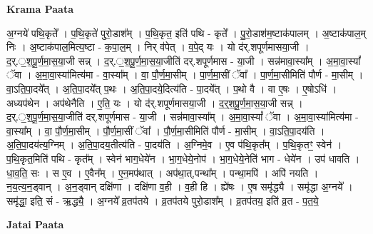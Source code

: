 \documentclass[17pt]{extarticle}
\begin{document}
\textbf{Krama Paata} \newline

अ॒ग्नये॑ पथि॒कृते᳚ । प॒थि॒कृते॑ पुरो॒डाश᳚म् । प॒थि॒कृत॒ इति॑ पथि - कृते᳚ । पु॒रो॒डाश॑म॒ष्टाक॑पालम् । अ॒ष्टाक॑पाल॒म् निः । अ॒ष्टाक॑पाल॒मित्य॒ष्टा - क॒पा॒ल॒म् । निर् व॑पेत् । व॒पे॒द् यः । यो द॑र्.शपूर्णमासया॒जी । द॒र्.॒श॒पू॒र्ण॒मा॒स॒या॒जी सन्न् । द॒र्.॒श॒पू॒र्ण॒मा॒स॒या॒जीति॑ दर्.शपूर्णमास - या॒जी । सन्न॑मावा॒स्या᳚म् । अ॒मा॒वा॒स्यां᳚ ॅवा । अ॒मा॒वा॒स्या॑मित्य॑मा - वा॒स्या᳚म् । वा॒ पौ॒र्ण॒मा॒सीम् । पा॒र्ण॒मा॒सीं ॅवा᳚ । पा॒र्ण॒मा॒सीमिति॑ पौर्ण - मा॒सीम् । वा॒ऽति॒पा॒दये᳚त् । अ॒ति॒पा॒दये᳚त् प॒थः । अ॒ति॒पा॒दये॒दित्य॑ति - पा॒दये᳚त् । प॒थो वै । वा ए॒षः । ए॒षोऽधि॑ । अध्यप॑थेन । अप॑थेनैति । ए॒ति॒ यः । यो द॑र्.शपूर्णमासया॒जी । द॒र्॒श॒पू॒र्ण॒मा॒स॒या॒जी सन्न् । 
द॒र्.॒श॒पू॒र्ण॒मा॒स॒या॒जीति॑ दर्.शपूर्णमास - या॒जी । सन्न॑मावा॒स्या᳚म् । अ॒मा॒वा॒स्यां᳚ ॅवा । अ॒मा॒वा॒स्या॑मित्य॑मा - वा॒स्या᳚म् । वा॒ पौ॒र्ण॒मा॒सीम् । पौ॒र्ण॒मा॒सीं ॅवा᳚ । पौ॒र्ण॒मा॒सीमिति॑ पौर्ण - मा॒सीम् । वा॒ऽति॒पा॒दय॑ति । अ॒ति॒पा॒दय॑त्य॒ग्निम् । अ॒ति॒पा॒दय॒तीत्य॑ति - पा॒दय॑ति । अ॒ग्निमे॒व । ए॒व प॑थि॒कृत᳚म् । प॒थि॒कृतꣳ॒॒ स्वेन॑ । प॒थि॒कृत॒मिति॑ पथि - कृत᳚म् । स्वेन॑ भाग॒धेये॑न । भा॒ग॒धेये॒नोप॑ । भा॒ग॒धेये॒नेति॑ भाग - धेये॑न । उप॑ धावति । धा॒व॒ति॒ सः । स ए॒व । ए॒वैन᳚म् । ए॒न॒मप॑थात् । अप॑था॒त्,पन्था᳚म् । पन्था॒मपि॑ । अपि॑ नयति । न॒य॒त्य॒न॒ड्वान् । अ॒न॒ड्वान् दक्षि॑णा । दक्षि॑णा व॒ही । व॒ही हि । ह्ये॑षः । ए॒ष समृ॑द्ध्यै । समृ॑द्धा अ॒ग्नये᳚ । समृ॑द्धा॒ इति॒ सं - ऋ॒द्ध्यै॒ । अ॒ग्नये᳚ व्र॒तप॑तये । व्र॒तप॑तये पुरो॒डाश᳚म् । व्र॒तप॑तय॒ इति॑ व्र॒त - प॒त॒ये॒ \newline

\textbf{Jatai Paata} \newline
\end{document}
